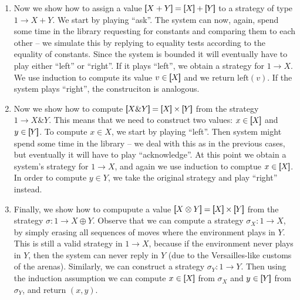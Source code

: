 \begin{enumerate}
    


    \item Now we show how to assign a value $\sem{X + Y} = \sem{X} + \sem{Y}$ to a strategy of type $1 \to X+Y$. We start by playing 
    ``ask''. The system can now, again, spend some time in the library requesting for constants and comparing them to 
    each other -- we simulate this by replying to equality tests according to the equality of constants. 
    Since the system is bounded it will eventually have to play either ``left'' or ``right''.
    If it plays ``left'', we obtain a strategy for $1 \to X$. We use induction to
    compute its value $v \in [\!\![X]\!\!]$ and we return $\text{left}(v)$. 
    If the system plays ``right'', the construciton is analogous. 

    \item Now we show how to compute $\sem{X \& Y} = \sem{X} \times \sem{Y}$ from the strategy $1 \to X \& Y$.
          This means that we need to construct two values: $x \in [\!\![X]\!\!]$ and $y \in [\!\![Y]\!\!]$.
          To compute $x \in X$, we start by playing ``left''. Then system might spend some time in the library -- 
          we deal with this as in the previous cases, but eventually it will have to play ``acknowledge''. 
          At this point we obtain a system's strategy for $1 \to X$, and again we use induction to comptue $x \in [\!\![X]\!\!]$.
          In order to compute $y \in Y$, we take the original strategy and play ``right'' instead. 


    \item Finally, we show how to compupute a value $\sem{X \otimes Y} = \sem{X} \times \sem{Y}$ from 
          the strategy $\sigma : 1 \to X \oplus Y$. Observe that we can compute a strategy 
          $\sigma_X : 1 \to X$, by simply erasing all sequences of moves where the environment plays in $Y$. 
          This is still a valid strategy in $1 \to X$, because if the environment never plays in $Y$, then 
          the system can never reply in $Y$ (due to the Versailles-like customs of the arenas).
          Similarly, we can construct a strategy $\sigma_Y : 1 \to Y$.
          Then using the induction assumption we can compute $x \in [\!\![X]\!\!]$
          from $\sigma_X$ and $y \in [\!\![Y]\!\!]$ from $\sigma_Y$, and return $(x, y)$.
\end{enumerate}
